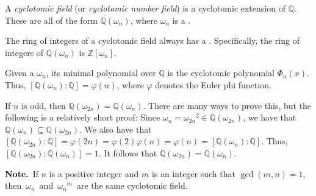 \documentclass[12pt]{article}
\begin{document}
A \emph{cyclotomic field} (or \emph{cyclotomic number field}) is a cyclotomic extension of $\mathbb{Q}$.  These are all of the form $\mathbb{Q}(\omega_n)$, where $\omega_n$ is a .

The ring of integers of a cyclotomic field always has a .  Specifically, the ring of integers of $\mathbb{Q}(\omega_n)$ is $\mathbb{Z}[\omega_n]$.

Given a  $\omega_n$, its minimal polynomial over $\mathbb{Q}$ is the cyclotomic polynomial $\Phi_n(x)$.  Thus, $[\mathbb{Q}(\omega_n)\!:\!\mathbb{Q}]=\varphi(n)$, where $\varphi$ denotes the Euler phi function.

If $n$ is odd, then $\mathbb{Q}(\omega_{2n})=\mathbb{Q}(\omega_n)$.  There are many ways to prove this, but the following is a relatively short proof:  Since $\omega_n={\omega_{2n}}^2\in \mathbb{Q}(\omega_{2n})$, we have that $\mathbb{Q}(\omega_n)\subseteq\mathbb{Q}(\omega_{2n})$.  We also have that $[\mathbb{Q}(\omega_{2n})\!:\!\mathbb{Q}]=\varphi(2n)=\varphi(2)\varphi(n)=\varphi(n)=[\mathbb{Q}(\omega_n)\!:\!\mathbb{Q}]$.  Thus, $[\mathbb{Q}(\omega_{2n})\!:\!\mathbb{Q}(\omega_n)]=1$.  It follows that $\mathbb{Q}(\omega_{2n})=\mathbb{Q}(\omega_n)$.

\textbf{Note.}\, If $n$ is a positive integer and $m$ is an integer such that $\gcd(m,n)=1$, then\, $\omega_n$\, and\, ${\omega_n}^m$\, are  the same cyclotomic field.
\end{document}
